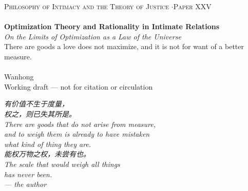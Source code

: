 \documentclass[11pt,a4paper]{article}
\begin{document}
\thispagestyle{empty}
\begin{center}
\vspace*{2cm}
{\footnotesize\color{rosedeep}\scshape Philosophy of Intimacy and the Theory of Justice \quad$\cdot$\quad Paper XXV}\\[0.3cm]
\coverrule\\[1.2cm]
{\LARGE\bfseries\color{warnred} Optimization Theory and Rationality in Intimate Relations}\\[0.7cm]
{\large\itshape\color{warnred} On the Limits of Optimization as a Law of the Universe}\\[0.8cm]
{\normalsize\color{inksoft} There are goods a love does not maximize, and it is not for want of a better measure.}\\[2cm]
\coverrule[0.25]\\[0.6cm]
{\normalsize\color{inksoft} Wanhong}\\
\vfill
{\footnotesize\color{gold} Working draft --- not for citation or circulation}
\coverfootnote
\end{center}
\newpage

\thispagestyle{empty}
\vspace*{2.2cm}
\begin{center}
\begin{minipage}{0.76\linewidth}
\centering\itshape\color{rose}
{\cjk 有价值不生于度量，}\\[0.3em]
{\cjk 权之，则已失其所是。}\\[0.5em]
There are goods that do not arise from measure,\\[0.15em]
and to weigh them is already to have mistaken\\[0.15em]
what kind of thing they are.\\[1.4em]
\upshape\itshape
{\cjk 能权万物之权，未尝有也。}\\[0.3em]
The scale that would weigh all things\\[0.15em]
has never been.\\[0.6em]
{\upshape\footnotesize\color{gold} --- the author}
\end{minipage}
\end{center}
\newpage
\end{document}
